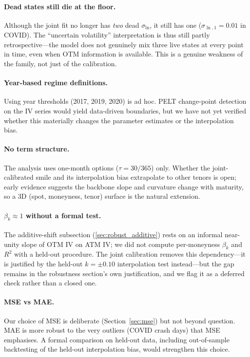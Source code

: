 \documentclass[12pt]{article}
\begin{document}
\paragraph{Dead states still die at the floor.} Although the joint fit no longer has \emph{two} dead $\sigma_{\ln}$, it still has one ($\sigma_{\ln,1}=0.01$ in COVID). The ``uncertain volatility'' interpretation is thus still partly retrospective---the model does not genuinely mix three live states at every point in time, even when OTM information is available. This is a genuine weakness of the family, not just of the calibration.

\paragraph{Year-based regime definitions.} Using year thresholds (2017, 2019, 2020) is ad hoc. PELT change-point detection on the IV series would yield data-driven boundaries, but we have not yet verified whether this materially changes the parameter estimates or the interpolation bias.

\paragraph{No term structure.} The analysis uses one-month options ($\tau = 30/365$) only. Whether the joint-calibrated smile and its interpolation bias extrapolate to other tenors is open; early evidence suggests the backbone slope and curvature change with maturity, so a 3D (spot, moneyness, tenor) surface is the natural extension.

\paragraph{$\beta_k \approx 1$ without a formal test.} The additive-shift subsection (\ref{sec:robust_additive}) rests on an informal near-unity slope of OTM IV on ATM IV; we did not compute per-moneyness $\beta_k$ and $R^2$ with a held-out procedure. The joint calibration removes this dependency---it is justified by the held-out $k=\pm 0.10$ interpolation test instead---but the gap remains in the robustness section's own justification, and we flag it as a deferred check rather than a closed one.

\paragraph{MSE vs MAE.} Our choice of MSE is deliberate (Section~\ref{sec:mse}) but not beyond question. MAE is more robust to the very outliers (COVID crash days) that MSE emphasises. A formal comparison on held-out data, including out-of-sample backtesting of the held-out interpolation bias, would strengthen this choice.
\end{document}
